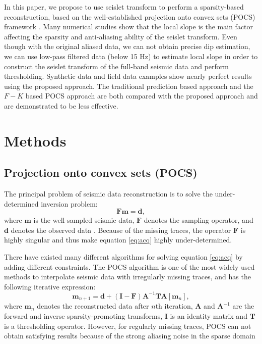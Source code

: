In this paper, we propose to use seislet transform to perform a sparsity-based reconstruction, based on the well-established projection onto convex sets (POCS) framework \cite{abma2006}. Many numerical studies show that the local slope is the main factor affecting the sparsity and anti-aliasing ability of the seislet transform. Even though with the original aliased data, we can not obtain precise dip estimation, we can use low-pass filtered data (below 15 Hz) to estimate local slope in order to construct the seislet transform of the full-band seismic data and perform thresholding. Synthetic data and field data examples show nearly perfect results using the proposed approach. The traditional prediction based approach and the $F-K$ based POCS approach are both compared with the proposed approach and are demonstrated to be less effective.

\section{Methods}
\subsection{Projection onto convex sets (POCS)}
The principal problem of seismic data reconstruction is to solve the under-determined inversion problem:
\begin{equation}
\label{eq:acq}
\mathbf{Fm}=\mathbf{d},
\end{equation}
where $\mathbf{m}$ is the well-sampled seismic data, $\mathbf{F}$ denotes the sampling operator, and $\mathbf{d}$ denotes the observed data \cite{yangkang2014halfthr}. Because of the missing traces, the operator $\mathbf{F}$ is highly singular and thus make equation \ref{eq:acq} highly under-determined.

There have existed many different algorithms for solving equation \ref{eq:acq} by adding different constraints. The POCS algorithm \cite{abma2006} is one of the most widely used methods to interpolate seismic data with irregularly missing traces, and has the following iterative expression:
\begin{equation} 
\label{eq:pocs}
\mathbf{m}_{n+1}=\mathbf{d}+(\mathbf{I}-\mathbf{F})\mathbf{A}^{-1}\mathbf{T}\mathbf{A}[\mathbf{m}_n],
\end{equation}
where $\mathbf{m}_n$ denotes the reconstructed data after $n$th iteration, $\mathbf{A}$ and $\mathbf{A}^{-1}$ are the forward and inverse sparsity-promoting transforms, $\mathbf{I}$ is an identity matrix and $\mathbf{T}$ is a thresholding operator. However, for regularly missing traces, POCS can not obtain satisfying results because of the strong aliasing noise in the sparse domain

